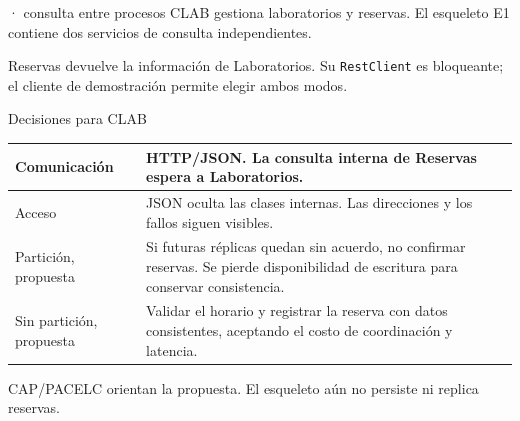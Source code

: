 \begin{frame}{\proyectoCuatro · consulta entre procesos}\relax
{\small CLAB gestiona laboratorios y reservas. El esqueleto E1 contiene dos servicios de consulta independientes. \cite{clabEsqueleto2026}}
\par\bigskip
\begin{center}

\end{center}
\medskip
{\small Reservas devuelve la información de Laboratorios. Su \texttt{RestClient} es bloqueante; el cliente de demostración permite elegir ambos modos.}
\end{frame}

\begin{frame}{Decisiones para CLAB}\relax
\small
\begin{tabularx}{\linewidth}{|l|X|}
\hline
Comunicación & HTTP/JSON. La consulta interna de Reservas espera a Laboratorios.\\\hline
Acceso & JSON oculta las clases internas. Las direcciones y los fallos siguen visibles.\\\hline
Partición, propuesta & Si futuras réplicas quedan sin acuerdo, no confirmar reservas. Se pierde disponibilidad de escritura para conservar consistencia.\\\hline
Sin partición, propuesta & Validar el horario y registrar la reserva con datos consistentes, aceptando el costo de coordinación y latencia.\\\hline
\end{tabularx}
\medskip
{\footnotesize CAP/PACELC orientan la propuesta. El esqueleto aún no persiste ni replica reservas. \cite{clabEsqueleto2026,ahmed2023clab}}
\end{frame}

